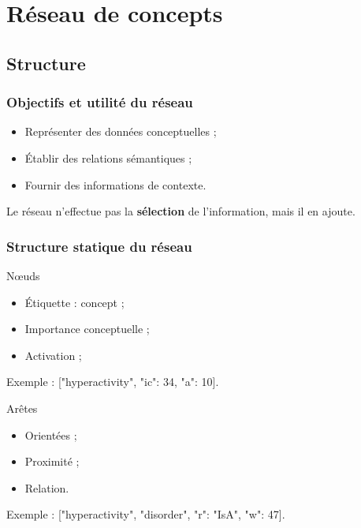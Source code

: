 \documentclass[12pt]{beamer}
\begin{document}
\section{Réseau de concepts}

\subsection{Structure}

\begin{frame}
 \frametitle{Objectifs et utilité du réseau}
 
 \begin{itemize}
  \item Représenter des données conceptuelles ;
  \item Établir des relations sémantiques ;
  \item Fournir des informations de contexte.
 \end{itemize}
 
 Le réseau n'effectue pas la \textbf{sélection} de l'information, mais il en ajoute.
 
\end{frame}


\begin{frame}[allowframebreaks = 0.7]
 \frametitle{Structure statique du réseau}
 
\begin{block}{N\oe uds}
\begin{itemize}
 \item Étiquette : concept ;
 \item Importance conceptuelle ;
 \item Activation ;
\end{itemize}

Exemple : ["hyperactivity", "ic": 34, "a": 10].

\end{block}
 
\begin{block}{Arêtes}
 \begin{itemize}
  \item Orientées ;
  \item Proximité ;
  \item Relation.
 \end{itemize}

Exemple : ["hyperactivity", "disorder", {"r": "IsA", "w": 47}].
 
\end{block}

 
\end{frame}
\end{document}
